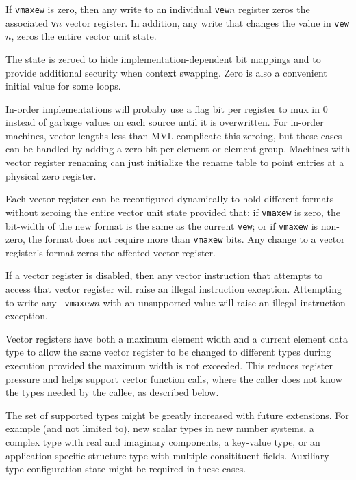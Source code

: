 If {\tt vmaxew} is zero, then any write to an individual {\tt vew}$n$
register zeros the associated {\tt v}$n$ vector register.  In addition,
any write that changes the value in {\tt vew}$n$, zeros the entire vector
unit state.

\begin{commentary}
  The state is zeroed to hide implementation-dependent bit mappings
  and to provide additional security when context swapping.  Zero is
  also a convenient initial value for some loops.

  In-order implementations will probaby use a flag bit per register to
  mux in 0 instead of garbage values on each source until it is
  overwritten.  For in-order machines, vector lengths less than MVL
  complicate this zeroing, but these cases can be handled by adding a
  zero bit per element or element group.  Machines with vector
  register renaming can just initialize the rename table to point
  entries at a physical zero register.
\end{commentary}

Each vector register can be reconfigured dynamically to hold different
formats without zeroing the entire vector unit state provided that: if
{\tt vmaxew} is zero, the bit-width of the new format is the same as
the current {\tt vew}; or if {\tt vmaxew} is non-zero, the format does
not require more than {\tt vmaxew} bits.  Any change to a vector
register's format zeros the affected vector register.

If a vector register is disabled, then any vector instruction
that attempts to access that vector register will raise an
illegal instruction exception.  Attempting to write any {\tt
  vmaxew}$n$ with an unsupported value will raise an illegal
instruction exception.

\begin{commentary}
  Vector registers have both a maximum element width and a
  current element data type to allow the same vector register to
  be changed to different types during execution provided the
  maximum width is not exceeded.  This reduces register pressure and
  helps support vector function calls, where the caller does not know
  the types needed by the callee, as described below.
\end{commentary}

\begin{commentary}
  The set of supported types might be greatly increased with future
  extensions.  For example (and not limited to), new scalar types in
  new number systems, a complex type with real and imaginary
  components, a key-value type, or an application-specific structure
  type with multiple consitituent fields.  Auxiliary type
  configuration state might be required in these cases.
\end{commentary}

